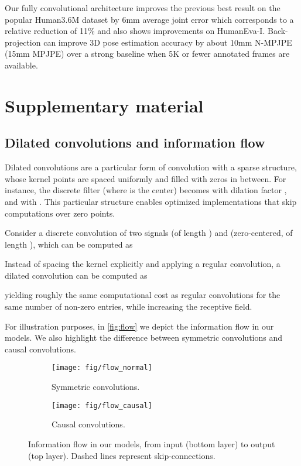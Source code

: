 \documentclass[10pt,twocolumn,letterpaper]{article}
\begin{document}
Our fully convolutional architecture improves the previous best result on the popular Human3.6M dataset by 6mm average joint error which corresponds to a relative reduction of 11\% and also shows improvements on HumanEva-I.
Back-projection can improve 3D pose estimation accuracy by about 10mm N-MPJPE (15mm MPJPE) over a strong baseline when 5K or fewer annotated frames are available.
 
{\small


}

\clearpage
\newpage
\appendix
\section{Supplementary material}
\subsection{Dilated convolutions and information flow}
\label{app:flow}

Dilated convolutions are a particular form of convolution with a sparse structure, whose kernel points are spaced uniformly and filled with zeros in between. For instance, the discrete filter  (where  is the center) becomes  with dilation factor , and  with . This particular structure enables optimized implementations that skip computations over zero points.

Consider a discrete convolution of two signals  (of length ) and  (zero-centered, of length ), which can be computed as

Instead of spacing the kernel explicitly and applying a regular convolution, a dilated convolution can be computed as

yielding roughly the same computational cost as regular convolutions for the same number of non-zero entries, while increasing the receptive field.

For illustration purposes, in \autoref{fig:flow} we depict the information flow in our models. We also highlight the difference between symmetric convolutions and causal convolutions.

\begin{figure}[h]
    \centering
    \begin{subfigure}{\linewidth}
        \centering
        \texttt{[image: fig/flow\_normal]}
        \caption{Symmetric convolutions.}
	    \label{fig:flow_normal}
    \end{subfigure}
    
    \vspace{3mm}
    
    \begin{subfigure}{\linewidth}
        \centering
        \texttt{[image: fig/flow\_causal]}
        \caption{Causal convolutions.}
	    \label{fig:flow_causal}
    \end{subfigure}
	\caption{Information flow in our models, from input (bottom layer) to output (top layer). Dashed lines represent skip-connections.}
	\label{fig:flow}
\end{figure}
\end{document}
